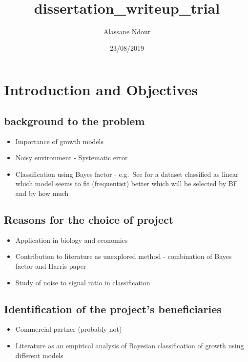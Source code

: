 \documentclass[]{article}
\title{dissertation\_writeup\_trial}
\author{Alassane Ndour}
\date{23/08/2019}
\providecommand{\tightlist}{%
  \setlength{\itemsep}{0pt}\setlength{\parskip}{0pt}}
\begin{document}
\maketitle

\hypertarget{introduction-and-objectives}{%
\section{Introduction and
Objectives}\label{introduction-and-objectives}}

\hypertarget{background-to-the-problem}{%
\subsection{background to the problem}\label{background-to-the-problem}}

\begin{itemize}
\tightlist
\item
  Importance of growth models
\item
  Noisy environment - Systematic error
\item
  Classification using Bayes factor - e.g.~See for a dataset classified
  as linear which model seems to fit (frequentist) better which will be
  selected by BF and by how much
\end{itemize}

\hypertarget{reasons-for-the-choice-of-project}{%
\subsection{Reasons for the choice of
project}\label{reasons-for-the-choice-of-project}}

\begin{itemize}
\item
  Application in biology and economics
\item
  Contribution to literature as unexplored method - combination of Bayes
  factor and Harris paper
\item
  Study of noise to signal ratio in classification
\end{itemize}

\hypertarget{identification-of-the-projects-beneficiaries}{%
\subsection{Identification of the project's
beneficiaries}\label{identification-of-the-projects-beneficiaries}}

\begin{itemize}
\tightlist
\item
  Commercial partner (probably not)
\item
  Literature as an empirical analysis of Bayesian classification of
  growth using different models
\end{itemize}
\end{document}
